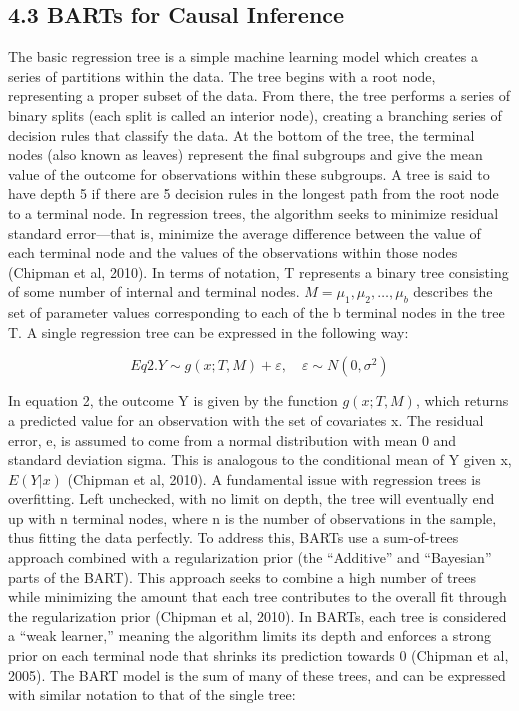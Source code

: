 \documentclass[
  12pt,
]{article}
\begin{document}
\subsection{4.3 BARTs for Causal
Inference}\label{barts-for-causal-inference}

The basic regression tree is a simple machine learning model which
creates a series of partitions within the data. The tree begins with a
root node, representing a proper subset of the data. From there, the
tree performs a series of binary splits (each split is called an
interior node), creating a branching series of decision rules that
classify the data. At the bottom of the tree, the terminal nodes (also
known as leaves) represent the final subgroups and give the mean value
of the outcome for observations within these subgroups. A tree is said
to have depth 5 if there are 5 decision rules in the longest path from
the root node to a terminal node. In regression trees, the algorithm
seeks to minimize residual standard error---that is, minimize the
average difference between the value of each terminal node and the
values of the observations within those nodes (Chipman et al, 2010). In
terms of notation, T represents a binary tree consisting of some number
of internal and terminal nodes. \(M = {\mu_1, \mu_2, …, \mu_b}\)
describes the set of parameter values corresponding to each of the b
terminal nodes in the tree T. A single regression tree can be expressed
in the following way:

\[Eq 2. Y \sim g(x; T, M) + \varepsilon,\quad \varepsilon \sim N(0, \sigma^2)\]

In equation 2, the outcome Y is given by the function \(g(x; T, M)\),
which returns a predicted value for an observation with the set of
covariates x. The residual error, e, is assumed to come from a normal
distribution with mean 0 and standard deviation sigma. This is analogous
to the conditional mean of Y given x, \(E(Y | x)\) (Chipman et al,
2010). A fundamental issue with regression trees is overfitting. Left
unchecked, with no limit on depth, the tree will eventually end up with
n terminal nodes, where n is the number of observations in the sample,
thus fitting the data perfectly. To address this, BARTs use a
sum-of-trees approach combined with a regularization prior (the
``Additive'' and ``Bayesian'' parts of the BART). This approach seeks to
combine a high number of trees while minimizing the amount that each
tree contributes to the overall fit through the regularization prior
(Chipman et al, 2010). In BARTs, each tree is considered a ``weak
learner,'' meaning the algorithm limits its depth and enforces a strong
prior on each terminal node that shrinks its prediction towards 0
(Chipman et al, 2005). The BART model is the sum of many of these trees,
and can be expressed with similar notation to that of the single tree:
\end{document}
